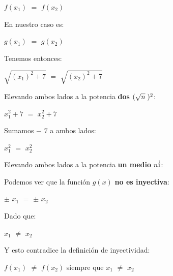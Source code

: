 \documentclass[12pt]{article}
\begin{document}
\hspace{4cm} $f(x_{1})$ $=$ $f(x_{2})$     \vspace{0.5cm}

En nuestro caso es:          \vspace{0.5cm}

\hspace{4cm} $g(x_{1})$ $=$ $g(x_{2})$    \vspace{0.5cm}

Tenemos entonces: \vspace{0.5cm}

\hspace{4cm} $\sqrt{(x_{1})^{2}+7}$ $=$ $\sqrt{(x_{2})^{2}+7}$           \vspace{0.5cm}

Elevando ambos lados a la potencia {\bfseries{dos}} $(\sqrt{n}\hspace{0.1cm})^{2}$: \vspace{0.5cm}

\hspace{4cm} $x_{1}^{2}+7$ $=$ $x_{2}^{2}+7$  \vspace{0.5cm}

Sumamos $-$ $7$ a ambos lados: \vspace{0.5cm}

\hspace{4cm} $x_{1}^{2}$ $=$ $x_{2}^{2}$  \vspace{0.5cm}

Elevando ambos lados a la potencia {\bfseries{un medio}} $n^{\frac{1}{2}}$: \vspace{0.5cm}

Podemos ver que la función $g(x)$ {\bfseries{no es inyectiva}}: \vspace{0.5cm}

\hspace{4cm} $\pm$ $x_{1}$ $=$ $\pm$ $x_{2}$  \vspace{0.5cm}

Dado que: \vspace{0.5cm}

\hspace{4cm} $x_{1}$ $\neq$ $x_{2}$ \vspace{0.5cm}

Y esto contradice la definición de inyectividad: \vspace{0.5cm}

\hspace{3cm}$f(x_{1})$ $\neq$ $f(x_{2})$ siempre que $x_{1}$ $\neq$ $x_{2}$ \vspace{0.5cm}
\end{document}
